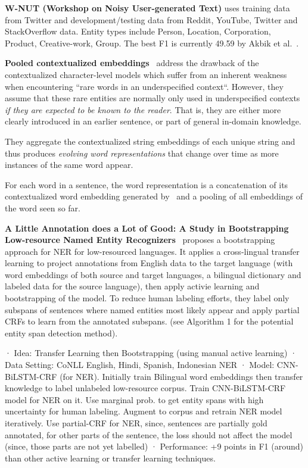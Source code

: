 \textbf{W-NUT (Workshop on Noisy User-generated Text)} uses training data from Twitter and development/testing data from Reddit, YouTube, Twitter and StackOverflow data.
Entity types include Person, Location, Corporation, Product, Creative-work, Group.
The best F1 is currently 49.59 by Akbik et al.~\cite{akbik-etal-2019-pooled}.

\textbf{Pooled contextualized embeddings}~\cite{akbik-etal-2019-pooled} address the drawback of the contextualized character-level models which suffer 
from an inherent weakness when encountering ``rare words in an underspecified context``.
However, they assume that these rare entities are normally only used in underspecified contexts \textit{if they are expected to be known to the reader}. 
That is, they are either more clearly introduced in an earlier sentence, or part of general in-domain knowledge.

They aggregate the contextualized string embeddings of each unique string 
 and thus produces \textit{evolving word representations} that change over time as more instances of the same word appear. 

For each word in a sentence, the word representation is a concatenation of its contextualized word embedding generated by~\cite{akbik-etal-2018-contextual} and a pooling of
all embeddings of the word seen so far.

\textbf{A Little Annotation does a Lot of Good: A Study in Bootstrapping Low-resource Named Entity Recognizers}~\cite{ChaudharyXSNC19}
proposes a bootstrapping approach for NER for low-resourced languages.
It applies a cross-lingual transfer learning to project annotations from English data to the target language (with word embeddings of both source and target languages, a bilingual dictionary and labeled data for the source language), then apply activie learning
and bootstrapping of the model.
To reduce human labeling efforts, they label only subspans of sentences where named entities most likely appear and apply partial CRFs to learn from the annotated subspans.
(see Algorithm 1 for the potential entity span detection method).

·        Idea: Transfer Learning then Bootstrapping (using manual active learning)
·        Data Setting: CoNLL English, Hindi, Spanish, Indonesian NER
·        Model: CNN-BiLSTM-CRF (for NER). Initially train Bilingual word embeddings then transfer knowledge to label unlabeled low-resource corpus. Train CNN-BiLSTM-CRF model for NER on it. Use marginal prob. to get entity spans with high uncertainty for human labeling. Augment to corpus and retrain NER model iteratively. Use partial-CRF for NER, since, sentences are partially gold annotated, for other parts of the sentence, the loss should not affect the model (since, those parts are not yet labelled)
·        Performance: +9 points in F1 (around) than other active learning or transfer learning techniques.

